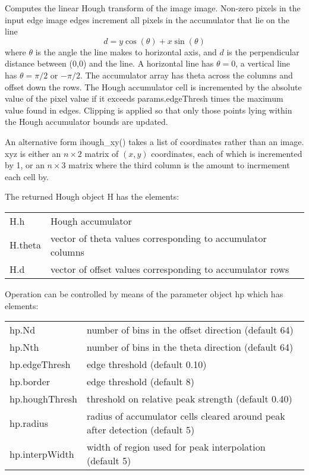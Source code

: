 \documentclass{article}
\newcommand{\mdes}[1]{\hskip -1.25in 
{\hbox{\makebox[1.25in][l]{\Refon Description}}}{#1}\vskip 0.25in}
\newcommand{\var}[1]{{\vtt #1}}
\begin{document}
{{{\mdes{Computes the linear Hough transform of the image \var{image}.
Non-zero pixels in the input edge image \var{edges} increment all pixels in the
accumulator that lie on the line
\begin{equation}
        d = y \cos(\theta) + x \sin(\theta)
\end{equation}	
where $\theta$ is the angle the line makes to horizontal axis, and $d$ is
the perpendicular distance between (0,0) and the line.  A horizontal
line has $\theta = 0$, a vertical line has $\theta = \pi/2$ or $-\pi/2$.
The accumulator array has theta across the columns and offset down
the rows.
The Hough accumulator cell is incremented by the
absolute value of the pixel value if it exceeds
\var{params.edgeThresh} times the maximum value found in \var{edges}.
Clipping is applied so that only those points lying within the Hough
accumulator bounds are updated.

An alternative form \var{ihough\_xy()} takes a list of coordinates
rather than an image.  \var{xyz} is either an $n \times 2$ matrix of
$(x,y)$ coordinates, each of which is incremented by 1, or an 
$n \times 3$ matrix where the third column is the amount to incrmement
each cell by.

The returned Hough object \var{H} has the elements:

\begin{tabular}{lp{10cm}}
\var{H.h} & Hough accumulator \\
\var{H.theta} & vector of theta values corresponding to accumulator columns\\
\var{H.d} & vector of offset values corresponding to accumulator rows 
\end{tabular}

Operation can be controlled by means of the parameter object \var{hp}
which has elements:

\begin{tabular}{lp{10cm}}
\var{hp.Nd} & number of bins in the offset direction (default 64) \\
\var{hp.Nth} & number of bins in the theta direction (default 64) \\
\var{hp.edgeThresh} & edge threshold (default 0.10) \\
\var{hp.border} & edge threshold (default 8) \\
\var{hp.houghThresh} & threshold on relative peak strength (default 0.40) \\
\var{hp.radius} & radius of accumulator cells cleared around peak after detection (default 5) \\
\var{hp.interpWidth} &  width of region used for peak interpolation (default 5)
\end{tabular}

}}}}
\end{document}
